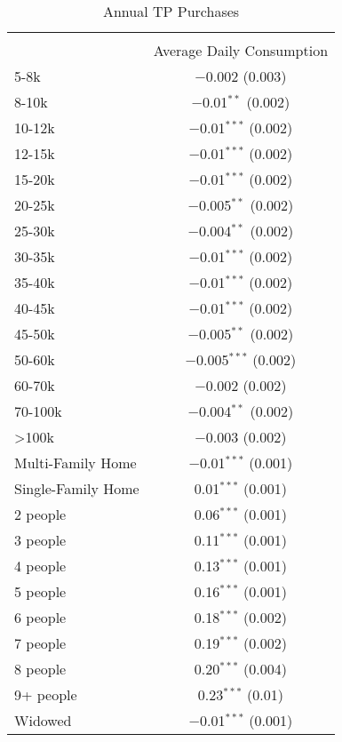 
\begin{table}[!htbp] \centering 
  \caption{Annual TP Purchases} 
  \label{tab:annualTP} 
\begin{tabular}{@{\extracolsep{5pt}}lc} 
\\[-1.8ex]\hline 
\hline \\[-1.8ex] 
 & Average Daily Consumption \\ 
 5-8k & $-$0.002 (0.003) \\ 
  8-10k & $-$0.01$^{**}$ (0.002) \\ 
  10-12k & $-$0.01$^{***}$ (0.002) \\ 
  12-15k & $-$0.01$^{***}$ (0.002) \\ 
  15-20k & $-$0.01$^{***}$ (0.002) \\ 
  20-25k & $-$0.005$^{**}$ (0.002) \\ 
  25-30k & $-$0.004$^{**}$ (0.002) \\ 
  30-35k & $-$0.01$^{***}$ (0.002) \\ 
  35-40k & $-$0.01$^{***}$ (0.002) \\ 
  40-45k & $-$0.01$^{***}$ (0.002) \\ 
  45-50k & $-$0.005$^{**}$ (0.002) \\ 
  50-60k & $-$0.005$^{***}$ (0.002) \\ 
  60-70k & $-$0.002 (0.002) \\ 
  70-100k & $-$0.004$^{**}$ (0.002) \\ 
  >100k & $-$0.003 (0.002) \\ 
  Multi-Family Home & $-$0.01$^{***}$ (0.001) \\ 
  Single-Family Home & 0.01$^{***}$ (0.001) \\ 
  2 people & 0.06$^{***}$ (0.001) \\ 
  3 people & 0.11$^{***}$ (0.001) \\ 
  4 people & 0.13$^{***}$ (0.001) \\ 
  5 people & 0.16$^{***}$ (0.001) \\ 
  6 people & 0.18$^{***}$ (0.002) \\ 
  7 people & 0.19$^{***}$ (0.002) \\ 
  8 people & 0.20$^{***}$ (0.004) \\ 
  9+ people & 0.23$^{***}$ (0.01) \\ 
  Widowed & $-$0.01$^{***}$ (0.001) \\ 

\end{tabular}
\end{table}
